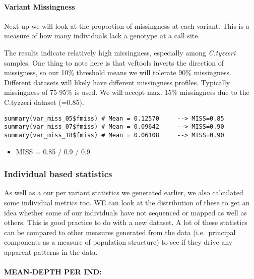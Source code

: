 \documentclass[
]{article}
\providecommand{\tightlist}{%
  \setlength{\itemsep}{0pt}\setlength{\parskip}{0pt}}
\begin{document}
\hypertarget{variant-missingness}{%
\paragraph{Variant Missingness}\label{variant-missingness}}

Next up we will look at the proportion of missingness at each variant.
This is a measure of how many individuals lack a genotype at a call
site.

The results indicate relatively high missingness, especially among
\emph{C.tyzzeri} samples. One thing to note here is that vcftools
inverts the direction of missigness, so our 10\% threshold means we will
tolerate 90\% missingness. Different datasets will likely have different
missingness profiles. Typically missingness of 75-95\% is used. We will
accept max. 15\% missingness due to the C.tyzzeri dataset (=0.85).

\begin{verbatim}
summary(var_miss_05$fmiss) # Mean = 0.12570     --> MISS=0.85
summary(var_miss_07$fmiss) # Mean = 0.09642     --> MISS=0.90
summary(var_miss_18$fmiss) # Mean = 0.06108     --> MISS=0.90
\end{verbatim}

\begin{itemize}
\tightlist
\item
  MISS = 0.85 / 0.9 / 0.9
\end{itemize}

\hypertarget{individual-based-statistics}{%
\subsubsection{Individual based
statistics}\label{individual-based-statistics}}

As well as a our per variant statistics we generated earlier, we also
calculated some individual metrics too. WE can look at the distribution
of these to get an idea whether some of our individuals have not
sequenced or mapped as well as others. This is good practice to do with
a new dataset. A lot of these statistics can be compared to other
measures generated from the data (i.e.~principal components as a measure
of population structure) to see if they drive any apparent patterns in
the data.

\hypertarget{mean-depth-per-ind}{%
\paragraph{MEAN-DEPTH PER IND:}\label{mean-depth-per-ind}}
\end{document}
